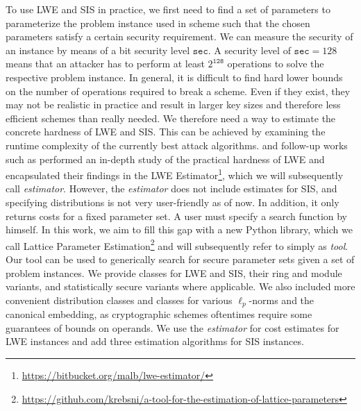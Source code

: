 \documentclass[
  a4paper,  %
  twoside,  %
  bibliography=totoc,
  headsepline,
  cleardoublepage=empty,
  parskip=half,
  draft=false
]{scrbook}
\begin{document}



To use LWE and SIS in practice, we first need to find a set of parameters to parameterize the problem instance used in scheme such that the chosen parameters satisfy a certain security requirement. We can measure the security of an instance by means of a bit security level $\texttt{sec}$. A security level of $\texttt{sec} = 128$ means that an attacker has to perform at least $2^\texttt{128}$ operations to solve the respective problem instance. In general, it is difficult to find hard lower bounds on the number of operations required to break a scheme. Even if they exist, they may not be realistic in practice and result in larger key sizes and therefore less efficient schemes than really needed. We therefore need a way to estimate the concrete hardness of LWE and SIS. This can be achieved by examining the runtime complexity of the currently best attack algorithms. \citet{APS15} and follow-up works such as \cite{Alb17,BBGS19} performed an in-depth study of the practical hardness of LWE and encapsulated their findings in the LWE Estimator\footnote{\url{https://bitbucket.org/malb/lwe-estimator/}}, which we will subsequently call \textit{estimator}. However, the \textit{estimator} does not include estimates for SIS, and specifying distributions is not very user-friendly as of now. In addition, it only returns costs for a fixed parameter set. A user must specify a search function by himself. In this work, we aim to fill this gap with a new Python library, which we call Lattice Parameter Estimation\footnote{\url{https://github.com/krebsni/a-tool-for-the-estimation-of-lattice-parameters}} and will subsequently refer to simply as \textit{tool}. Our tool can be used to generically search for secure parameter sets given a set of problem instances. We provide classes for LWE and SIS, their ring and module variants, and statistically secure variants where applicable. We also included more convenient distribution classes and classes for various $\ell_p$-norms and the canonical embedding, as cryptographic schemes oftentimes require some guarantees of bounds on operands. We use the \textit{estimator} for cost estimates for LWE instances and add three estimation algorithms for SIS instances.
\end{document}
